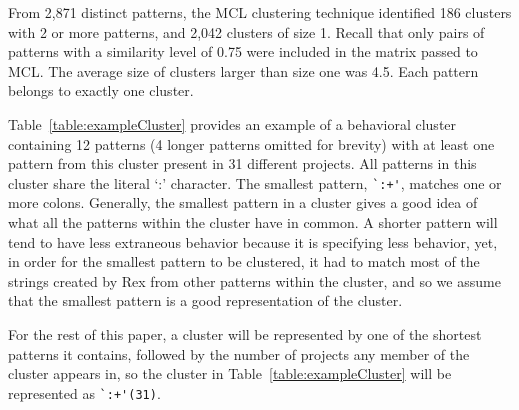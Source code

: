 From 2,871 distinct patterns, the MCL clustering technique identified 186 clusters with 2 or more patterns, and 2,042 clusters of size 1.  Recall that only pairs of patterns with a similarity level of 0.75 were included in the matrix passed to MCL.  The average size of clusters larger than size one was 4.5.  Each pattern belongs to exactly one cluster.




Table~\ref{table:exampleCluster} provides an example of a behavioral cluster containing 12 patterns (4 longer patterns omitted for brevity) with at least one pattern from this cluster present in 31 different projects.  All patterns in this cluster share the literal `:' character.
The smallest pattern, \verb!`:+'!,  matches one or more colons. Generally, the smallest pattern in a cluster gives a good idea of what all the patterns within the cluster have in common. 
 A shorter pattern will tend to have less extraneous behavior because it is specifying less behavior,   
yet, in order for the smallest pattern to be clustered, it had to match most of the strings created by Rex from other patterns within the cluster, and so we assume that {the smallest pattern is a good representation of the cluster}.

For the rest of this paper, a cluster will be represented by one of the shortest patterns it contains, followed by the number of projects any member of the cluster appears in, so the cluster in Table~\ref{table:exampleCluster} will be represented as \verb!`:+'(31)!.

